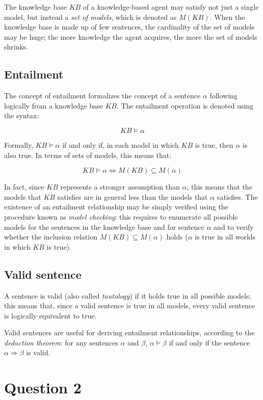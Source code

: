 \documentclass[letterpaper,headings=standardclasses]{scrartcl}
\begin{document}
The knowledge base $KB$ of a knowledge-based agent may satisfy not just a single model, but instead a \emph{set of models}, which is denoted as $M(KB)$. When the knowledge base is made up of few sentences, the cardinality of the set of models may be huge; the more knowledge the agent acquires, the more the set of models shrinks.

\subsection{Entailment}

The concept of entailment formalizes the concept of a sentence $\alpha$ following logically from a knowledge base $KB$. The entailment operation is denoted using the syntax:

$$ KB \models \alpha $$

Formally, $ KB \models \alpha $ if and only if, in each model in which $KB$ is true, then $\alpha$ is also true. In terms of sets of models, this means that:

$$ KB \models \alpha \Leftrightarrow M(KB) \subseteq M(\alpha) $$

In fact, since $KB$ represents a stronger assumption than $\alpha$, this means that the models that $KB$ satisfies are in general less than the models that $\alpha$ satisfies. The existence of an entailment relationship may be simply verified using the procedure known as \emph{model checking}: this requires to enumerate all possible models for the sentences in the knowledge base and for sentence $\alpha$ and to verify whether the inclusion relation $ M(KB) \subseteq M(\alpha) $ holds ($\alpha$ is true in all worlds in which $KB$ is true).

\subsection{Valid sentence}

A sentence is valid (also called \emph{tautology}) if it holds true in all possible models; this means that, since a valid sentence is true in all models, every valid sentence is logically equivalent to true.

Valid sentences are useful for deriving entailment relationships, according to the \emph{deduction theorem}: for any sentences $\alpha$ and $\beta$, $\alpha \models \beta$ if and only if the sentence $\alpha \Rightarrow \beta$ is valid.

\section{Question 2}
\end{document}
